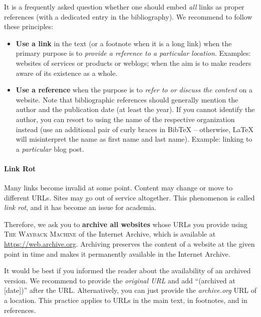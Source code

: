 It is a frequently asked question whether one should embed \emph{all} links as proper references (with a dedicated entry in the bibliography). We recommend to follow these principles:
\begin{itemize}
  \item \textbf{Use a link} in the text (or a footnote when it is a long link) when the primary purpose is to \emph{provide a reference to a particular location}. Examples: websites of services or products or weblogs; when the aim is to make readers aware of its existence as a whole.
  \item \textbf{Use a reference} when the purpose is to \emph{refer to or discuss the content} on a website. Note that bibliographic references should generally mention the author and the publication date (at least the year). If you cannot identify the author, you can resort to using the name of the respective organization instead (use an additional pair of curly braces in BibTeX -- otherwise, LaTeX will misinterpret the name as first name and last name). Example: linking to a \emph{particular} blog post.
\end{itemize}

\paragraph{Link Rot}

Many links become invalid at some point.
Content may change or move to different URLs. Sites may go out of service altogether. This phenomenon is called \emph{link rot}, and it has become an issue for academia.

Therefore, we ask you to \textbf{archive all websites} whose URLs you provide using \textsc{The Wayback Machine} of the Internet Archive, which is available at \url{https://web.archive.org}.
Archiving preserves the content of a website at the given point in time and makes it permanently available in the Internet Archive.

It would be best if you informed the reader about the availability of an archived version.
We recommend to provide the \emph{original URL} and add ``(archived at [date])'' after the URL.%
Alternatively, you can just provide the \emph{archive.org} URL of a location.
This practice applies to URLs in the main text, in footnotes, and in references.

